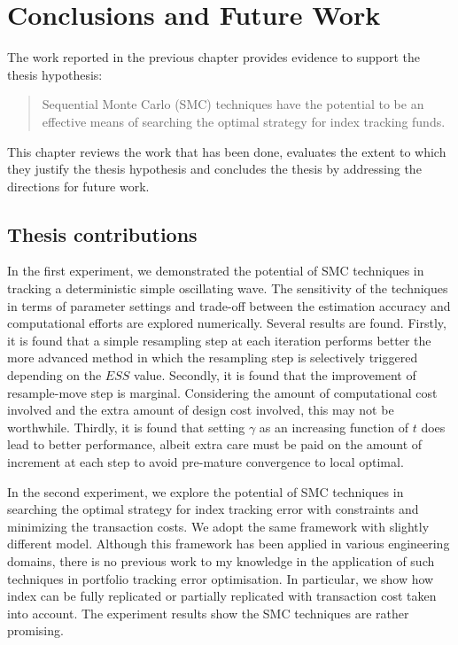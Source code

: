 \chapter{Conclusions and Future Work}
\graphicspath{{Chapter5/figures/}}
\label{EvaluationAndConclusion}
The work reported in the previous chapter provides evidence to support
the thesis hypothesis:
\begin{quote}
Sequential Monte Carlo (SMC) techniques have the potential to be an effective means of searching the optimal strategy for index tracking funds.
\end{quote}
This chapter reviews the work that has been done, evaluates the extent
to which they justify the thesis hypothesis and concludes the thesis
by addressing the directions for future work.

\section{Thesis contributions}
In the first experiment, we demonstrated the potential of SMC techniques in tracking a deterministic simple oscillating wave. The sensitivity of the techniques in terms of parameter settings and trade-off between the estimation accuracy and computational efforts are explored numerically. Several results are found. Firstly, it is found that a simple resampling step at each iteration performs better the more advanced method in which the resampling step is selectively triggered depending on the $ESS$ value. Secondly, it is found that the improvement of resample-move step is marginal. Considering the amount of computational cost involved and the extra amount of design cost involved, this may not be worthwhile. Thirdly, it is found that setting $\gamma$ as an increasing function of $t$ does lead to better performance, albeit extra care must be paid on the amount of increment at each step to avoid pre-mature convergence to local optimal. 

In the second experiment, we explore the potential of SMC techniques in searching the optimal strategy for index tracking error with constraints and minimizing the transaction costs. We adopt the same framework with slightly different model. Although this framework has been applied in various engineering domains, there is no previous work to my knowledge in the application of such techniques in portfolio tracking error optimisation. In particular, we show how index can be fully replicated or partially replicated with transaction cost taken into account. The experiment results show the SMC techniques are rather promising.

